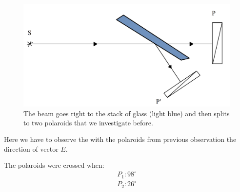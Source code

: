 \begin{minipage}{0.55\textwidth}
    \begin{figure}[h]
    \centering
    \includegraphics[width=1\textwidth]{images/stoletov.png}
    \caption{The beam goes right to the stack of glass (light blue) and then splits to two polaroids that we investigate before.}
\end{figure}
\end{minipage}
\hfill
\begin{minipage}{0.35\textwidth}
    Here we have to observe the with the polaroids from previous observation the direction of vector $E$.

    The polaroids were crossed when:
    \begin{align*}
    	P_1 \colon 98^\circ\\
    	P_2 \colon 26^\circ
    \end{align*}    
\end{minipage}

